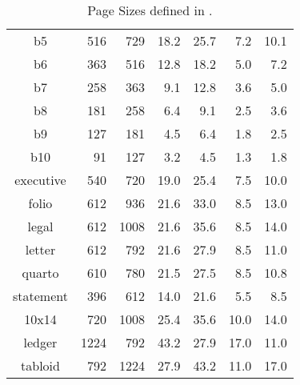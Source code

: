\begin{table}[!ht]
\begin{center}
{\begin{tabular}{|c||r|r||r|r||r|r|}
  b5          &  516 &  729 &  18.2 &  25.7 &   7.2 &  10.1 \\
  b6          &  363 &  516 &  12.8 &  18.2 &   5.0 &   7.2 \\
  b7          &  258 &  363 &   9.1 &  12.8 &   3.6 &   5.0 \\
  b8          &  181 &  258 &   6.4 &   9.1 &   2.5 &   3.6 \\
  b9          &  127 &  181 &   4.5 &   6.4 &   1.8 &   2.5 \\
  b10         &   91 &  127 &   3.2 &   4.5 &   1.3 &   1.8 \\ \hline\hline
  executive   &  540 &  720 &  19.0 &  25.4 &   7.5 &  10.0 \\
  folio       &  612 &  936 &  21.6 &  33.0 &   8.5 &  13.0 \\
  legal       &  612 & 1008 &  21.6 &  35.6 &   8.5 &  14.0 \\
  letter      &  612 &  792 &  21.6 &  27.9 &   8.5 &  11.0 \\
  quarto      &  610 &  780 &  21.5 &  27.5 &   8.5 &  10.8 \\
  statement   &  396 &  612 &  14.0 &  21.6 &   5.5 &   8.5 \\ \hline\hline
  10x14       &  720 & 1008 &  25.4 &  35.6 &  10.0 &  14.0 \\
  ledger      & 1224 &  792 &  43.2 &  27.9 &  17.0 &  11.0 \\
  tabloid     &  792 & 1224 &  27.9 &  43.2 &  11.0 &  17.0 \\ \hline
 \end{tabular}
} %
\caption{\label{tbl:PageSztbl}Page Sizes defined in {\prog}.}\hspace{1cm}
\end{center}
\end{table}
\vfill
